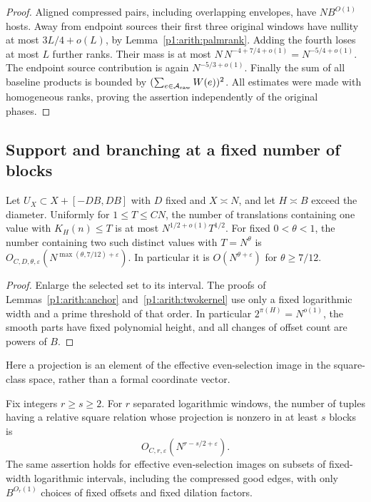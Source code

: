 \begin{proof}
Aligned compressed pairs, including overlapping envelopes, have
$NB^{O(1)}$ hosts.  Away from endpoint sources their first three original
windows have nullity at most $3L/4+o(L)$, by
Lemma~\ref{p1:arith:palmrank}.  Adding the fourth loses at most $L$
further ranks.  Their mass is at most
$N\,N^{-4+7/4+o(1)}=N^{-5/4+o(1)}$.
The endpoint source contribution is again $N^{-5/3+o(1)}$.
Finally the sum of all baseline products is bounded by
$(\sum_{e\in\mathcal A_{\rm raw}}W(e))^2$.
All estimates were made with homogeneous ranks, proving the assertion
independently of the original phases.
\end{proof}

\subsection{Support and branching at a fixed number of blocks}

\begin{lemma}
\label{p1:arith:small-kernels}
Let $U_X\subset X+[-DB,DB]$ with $D$ fixed and $X\asymp N$, and let
$H\asymp B$ exceed the diameter.  Uniformly for $1\leq T\leq CN$,
the number of translations containing one value with $K_H(n)\leq T$
is at most $N^{1/2+o(1)}T^{1/2}$.  For fixed $0<\theta<1$, the number
containing two such distinct values with $T=N^\theta$ is
$O_{C,D,\theta,\varepsilon}(N^{\max(\theta,7/12)+\varepsilon})$.
In particular it is $O(N^{\theta+\varepsilon})$ for $\theta\geq7/12$.
\end{lemma}

\begin{proof}
Enlarge the selected set to its interval.  The proofs of
Lemmas~\ref{p1:arith:anchor} and~\ref{p1:arith:twokernel} use only a
fixed logarithmic width and a prime threshold of that order.  In particular
$2^{\pi(H)}=N^{o(1)}$, the smooth parts have fixed polynomial height,
and all changes of offset count are powers of $B$.
\end{proof}

Here a projection is an element of the effective even-selection image
in the square-class space, rather than a formal coordinate vector.

\begin{proposition}
\label{p1:arith:fixed-support}
Fix integers $r\geq s\geq2$.  For $r$ separated logarithmic windows,
the number of tuples having a relative square relation whose projection
is nonzero in at least $s$ blocks is
\[
 O_{C,r,\varepsilon}\left(N^{r-s/2+\varepsilon}\right).
\]
The same assertion holds for effective even-selection images on subsets
of fixed-width logarithmic intervals, including the compressed good edges,
with only $B^{O_r(1)}$ choices of fixed offsets and fixed dilation factors.
\end{proposition}

